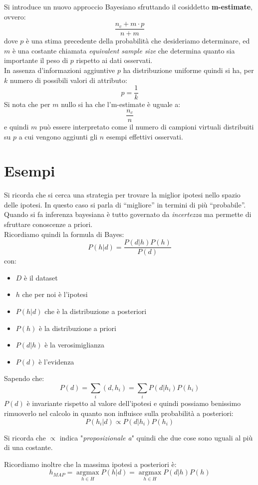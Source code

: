 Si introduce un nuovo approccio Bayesiano sfruttando il cosiddetto
\textbf{m-estimate}, ovvero: 
\[\frac{n_c+m\cdot p}{n+m}\]
dove $p$ è una stima precedente della probabilità che desideriamo determinare,
ed $m$ è una costante chiamata \textit{equivalent sample size} che determina
quanto sia importante il peso di $p$ rispetto ai dati osservati.\\
In assenza d'informazioni aggiuntive $p$ ha distribuzione uniforme quindi si
ha, per $k$ numero di possibili valori di attributo:
\[p=\frac{1}{k}\]
Si nota che per $m$ nullo si ha che l'm-estimate è uguale a:
\[\frac{n_c}{n}\]
e quindi $m$ può essere interpretato come il numero di campioni virtuali
distribuiti su $p$ a cui vengono aggiunti gli $n$ esempi effettivi osservati.
\section{Esempi}
Si ricorda che si cerca una strategia per trovare la miglior ipotesi nello
spazio delle ipotesi. In questo caso si parla di ``migliore'' in termini di più
``probabile''. \\
Quando si fa inferenza bayesiana è tutto governato da \textit{incertezza} ma
permette di sfruttare conoscenze a priori.\\
Ricordiamo quindi la formula di Bayes:
\[P(h|d)=\frac{P(d|h)P(h)}{P(d)}\]
con:
\begin{itemize}
  \item $D$ è il dataset
  \item $h$ che per noi è l'ipotesi
  \item $P(h|d)$ che è la distribuzione a posteriori
  \item $P(h)$ è la distribuzione a priori
  \item $P(d|h)$ è la verosimiglianza
  \item $P(d)$ è l'evidenza
\end{itemize}
Sapendo che:
\[P(d)=\sum_i(d, h_i)=\sum_i P(d|h_i)P(h_i)\]
$P(d)$ è invariante rispetto al valore dell'ipotesi e quindi possiamo benissimo
rimuoverlo nel calcolo in quanto non influisce sulla probabilità a posteriori:
\[P(h_i|d)\varpropto P(d|h_i)P(h_i)\]
\begin{nota}
    Si ricorda che $\varpropto$ indica "\textit{proposizionale a}" quindi che due
cose sono uguali al più di una costante.
\end{nota}
Ricordiamo inoltre che la massima ipotesi a posteriori è:
\[h_{MAP}=\operatorname*{argmax}_{h\in H}P(h|d)=
  \operatorname*{argmax}_{h\in H}P(d|h)P(h)\]
